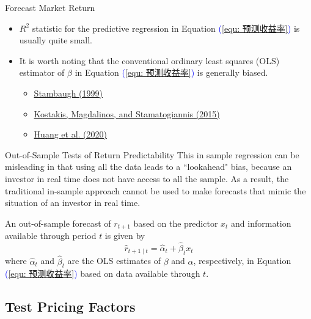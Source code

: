 \documentclass{beamer}
\begin{document}
\begin{frame}{Forecast Market Return}
\begin{itemize}
	\item $R^2$ statistic for the predictive regression in Equation \textcolor{blue}{(\ref{equ: 预测收益率})} is usually quite small.
	\item It is worth noting that the conventional ordinary least squares (OLS) estimator of $\beta$ in Equation \textcolor{blue}{(\ref{equ: 预测收益率})} is generally biased.

		\begin{itemize}
			\item \textcolor{blue}{\href{https://doi.org/10.1016/S0304-405X(99)00041-0}{Stambaugh (1999)}}
			\item \textcolor{blue}{\href{https://doi.org/10.1093/rfs/hhu139}{Kostakis, Magdalinos, and Stamatogiannis (2015)}}
			\item \textcolor{blue}{\href{https://doi.org/10.1016/j.jfineco.2019.08.004}{Huang et al. (2020)}}
		\end{itemize}
\end{itemize}
\end{frame}

\begin{frame}{Out-of-Sample Tests of Return Predictability}
	This in sample regression can be misleading in that using all the data leads to a ``lookahead" bias, because an investor in real time does not have access to all the sample.
	As a result, the traditional in-sample approach cannot be used to make forecasts that mimic the situation of an investor in real time.

	An out-of-sample forecast of $r_{t+1}$ based on the predictor $x_t$ and information available through period $t$ is given by
	\begin{equation}
		\hat{r}_{t+1 \mid t}=\hat{\alpha}_t+\hat{\beta}_t x_t
	\end{equation}
	where $\hat{\alpha}_t$ and $\hat{\beta}_t$ are the OLS estimates of $\beta$ and $\alpha$, respectively, in Equation \textcolor{blue}{(\ref{equ: 预测收益率})} based on data available through $t$.
\end{frame}

\subsection{Test Pricing Factors}
\end{document}

